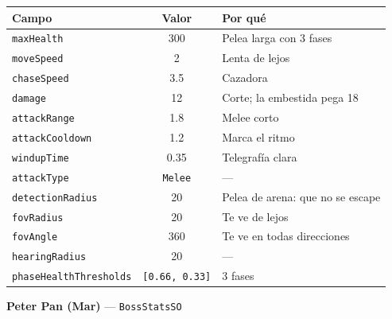 \documentclass[a4paper,12pt]{article}
\newcommand{\code}[1]{\texttt{#1}}
\begin{document}
\begin{center}
\begin{longtable}{|l|c|p{6.6cm}|}
\hline
\textbf{Campo} & \textbf{Valor} & \textbf{Por qué} \\
\hline
\endhead
\code{maxHealth} & 300 & Pelea larga con 3 fases \\
\hline
\code{moveSpeed} & 2 & Lenta de lejos \\
\hline
\code{chaseSpeed} & 3.5 & Cazadora \\
\hline
\code{damage} & 12 & Corte; la embestida pega 18 \\
\hline
\code{attackRange} & 1.8 & Melee corto \\
\hline
\code{attackCooldown} & 1.2 & Marca el ritmo \\
\hline
\code{windupTime} & 0.35 & Telegrafía clara \\
\hline
\code{attackType} & \code{Melee} & --- \\
\hline
\code{detectionRadius} & 20 & Pelea de arena: que no se escape \\
\hline
\code{fovRadius} & 20 & Te ve de lejos \\
\hline
\code{fovAngle} & 360 & Te ve en todas direcciones \\
\hline
\code{hearingRadius} & 20 & --- \\
\hline
\code{phaseHealthThresholds} & \code{[0.66, 0.33]} & 3 fases \\
\hline
\end{longtable}
\end{center}

\textbf{Peter Pan (Mar)} --- \code{BossStatsSO}
\end{document}

